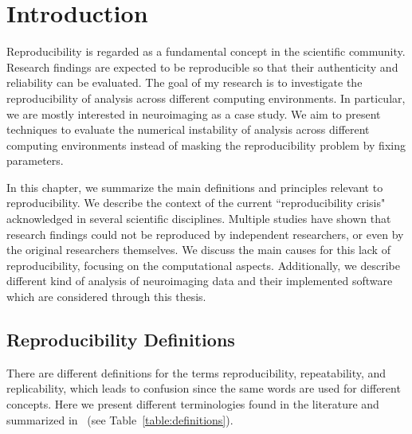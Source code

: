 \chapter{Introduction}
\label{ch:intro}

Reproducibility is regarded as a fundamental concept in the scientific 
community. Research findings are expected to be reproducible so that 
their authenticity and reliability can be evaluated. The goal of my 
research is to investigate the reproducibility of analysis across different 
computing environments. In particular, we are mostly interested in 
neuroimaging as a case study. We aim to present techniques to evaluate 
the numerical instability of analysis across different computing environments 
instead of masking the reproducibility problem by fixing parameters. 

In this chapter, we summarize the main definitions and 
principles relevant to reproducibility. We describe the context of the 
current ``reproducibility crisis" acknowledged in several scientific 
disciplines. Multiple studies have shown that research findings could 
not be reproduced by independent researchers, or even by the original 
researchers themselves. We discuss the main causes for this lack of 
reproducibility, focusing on the computational aspects. 
Additionally, we describe different kind of analysis of 
neuroimaging data and their implemented software which are considered 
through this thesis. 


\section{Reproducibility Definitions}

There are different definitions for the terms reproducibility, 
repeatability, and replicability, which leads to confusion since the 
same words are used for different concepts. Here we present different 
terminologies found in the literature and summarized 
in~\cite{plesser2018reproducibility} (see 
Table~\ref{table:definitions}).
 
